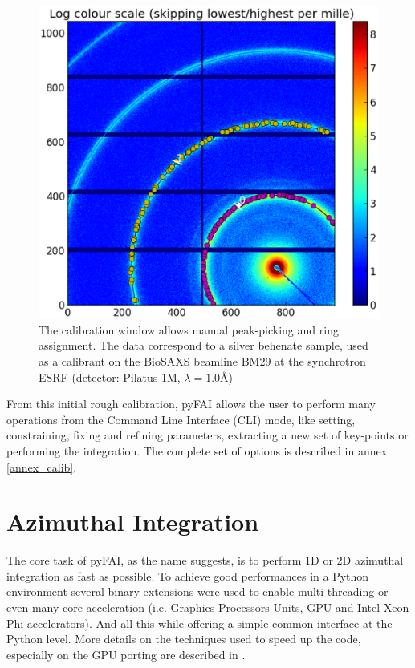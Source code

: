 \documentclass[preprint]{iucr}
\begin{document}
\begin{figure}
\label{calib}
\begin{center}
\includegraphics[width=15cm]{calib.eps}
\caption{The calibration window allows manual peak-picking and
ring assignment. The data correspond to a silver behenate sample, used as a
calibrant on the BioSAXS beamline BM29 at the synchrotron ESRF
(detector: Pilatus 1M, $\lambda=1.0${\AA})}
\end{center}
\end{figure}

From this initial rough calibration, pyFAI allows the user to perform many operations
from the Command Line Interface (CLI) mode, like setting, constraining, fixing and
refining parameters, extracting a new set of key-points or performing the
integration. The complete set of options is described in annex
\ref{annex_calib}.

\section{Azimuthal Integration}

The core task of pyFAI, as the name suggests, is to perform 1D or 2D azimuthal
integration as fast as possible. To achieve good performances in a Python environment
several binary extensions were used to enable multi-threading or even many-core
acceleration (i.e. Graphics Processors Units, GPU and Intel Xeon Phi accelerators).
And all this while offering a simple common interface at the Python level.
More details on the techniques used to speed up the code, especially on the GPU porting
are described in \cite{kieffer_ashiotis-proc-euroscipy-2014}.
\end{document}
